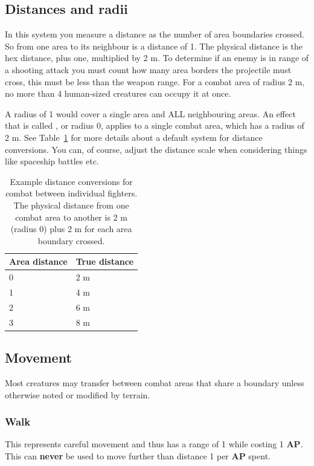 \documentclass[a4paper,10pt,oneside]{book}
\newcommand{\textlfirst}[1]{\textbf{\textit{\titlecap{#1}}}}
\newcommand{\dist}{2 m}
\begin{document}
\subsection{Distances and radii}
In this system you measure a distance as the number of area boundaries crossed. So from one area to its neighbour is a distance of 1. The physical distance is the hex distance, plus one, multiplied by \dist{}. To determine if an enemy is in range of a shooting attack you must count how many area borders the projectile must cross, this must be less than the weapon range. For a combat area of radius \dist{}, no more than 4 human-sized creatures can occupy it at once.

A radius of 1 would cover a single area and ALL neighbouring areas. An effect that is called \textlfirst{adjacent}, or radius 0, applies to a single combat area, which has a radius of \dist{}. See Table~\ref{tab:distances} for more details about a default system for distance conversions. You can, of course, adjust the distance scale when considering things like spaceship battles etc. 
\begin{table}[ht!]
	\centering
	\begin{tabular}{|l|l|}
		\hline
		Area distance & True distance \\
		\hline
		0 & \dist{}\\
		1 & 4 m \\
		2 & 6 m \\
		3 & 8 m\\
		\hline
	\end{tabular}
	\caption{Example distance conversions for combat between individual fighters. The physical distance from one combat area to another is \dist{} (radius 0) plus \dist{} for each area boundary crossed.}
	\label{tab:distances}
\end{table} 


\subsection{Movement}
Most creatures may transfer between combat areas that share a boundary unless otherwise noted or modified by terrain.

\subsubsection{Walk}
This represents careful movement and thus has a range of 1 while costing 1 \textbf{AP}. This can \textbf{never} be used to move further than distance 1 per \textbf{AP} spent.
\end{document}
